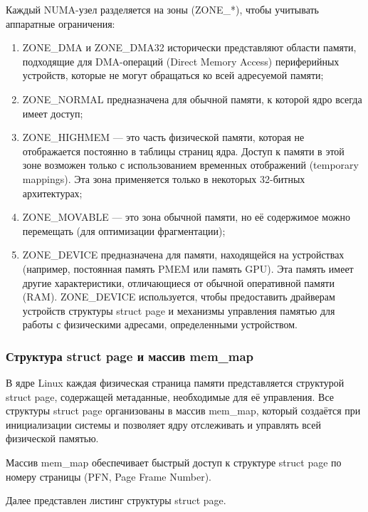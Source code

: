 Каждый NUMA-узел разделяется на зоны (ZONE\_*), чтобы учитывать аппаратные ограничения:

\begin{enumerate}
    \item ZONE\_DMA и ZONE\_DMA32 исторически представляют области памяти, подходящие для DMA-операций (Direct Memory Access) периферийных устройств, которые не могут обращаться ко всей адресуемой памяти;
    \item ZONE\_NORMAL предназначена для обычной памяти, к которой ядро всегда имеет доступ;
    \item ZONE\_HIGHMEM --- это часть физической памяти, которая не отображается постоянно в таблицы страниц ядра. Доступ к памяти в этой зоне возможен только с использованием временных отображений (temporary mappings). Эта зона применяется только в некоторых 32-битных архитектурах;
    \item ZONE\_MOVABLE --- это зона обычной памяти, но её содержимое можно перемещать (для оптимизации фрагментации);
    \item ZONE\_DEVICE предназначена для памяти, находящейся на устройствах (например, постоянная память PMEM или память GPU). Эта память имеет другие характеристики, отличающиеся от обычной оперативной памяти (RAM). ZONE\_DEVICE используется, чтобы предоставить драйверам устройств структуры {struct page} и механизмы управления памятью для работы с физическими адресами, определенными устройством.~\cite{mem}
\end{enumerate}

\subsubsection{Структура struct page и массив mem\_map}

В ядре Linux каждая физическая страница памяти представляется структурой {struct page}, содержащей метаданные, необходимые для её управления.
Все структуры {struct page} организованы в массив {mem\_map}, который создаётся при инициализации системы и позволяет ядру отслеживать и управлять всей физической памятью.

Массив mem\_map обеспечивает быстрый доступ к структуре {struct page} по номеру страницы (PFN, Page Frame Number).

Далее представлен листинг структуры {struct page}.

